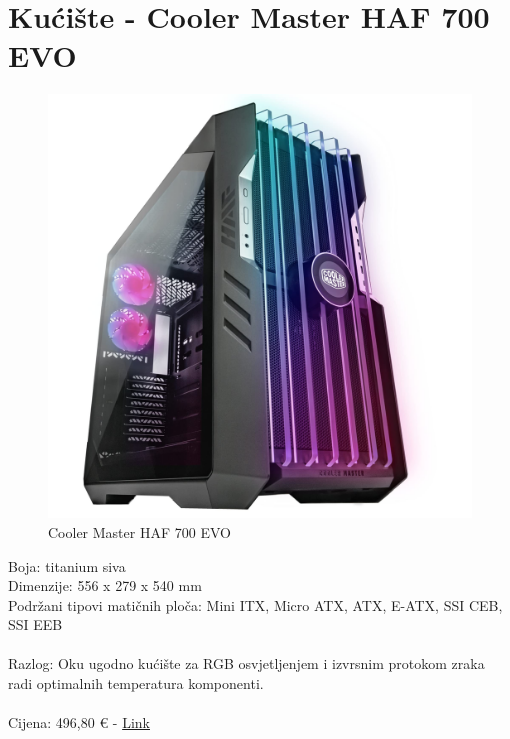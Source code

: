 \documentclass{report}
\begin{document}
\section{Kućište - Cooler Master HAF 700 EVO}
\begin{figure}[H]
    \centering
    \includegraphics[scale=0.1]{Slike/kuciste.jpg}
    \caption{Cooler Master HAF 700 EVO}
    \label{fig:kuciste}
\end{figure}
Boja: titanium siva\\Dimenzije: 556 x 279 x 540 mm\\Podržani tipovi matičnih ploča: Mini ITX, Micro ATX, ATX, E-ATX, SSI CEB, SSI EEB\\\\Razlog: Oku ugodno kućište za RGB osvjetljenjem i izvrsnim protokom zraka radi optimalnih temperatura komponenti.\\\\  Cijena: 496,80 € - \href{https://www.racunala.hr/cooler-master-haf700-evo-big-tower-schwarz-h700e-ignn-s00/224845/product/?utm\_source=nabava.net\&utm\_campaign=nabava.net\&utm\_medium=click}{Link}

\pagebreak
\end{document}
